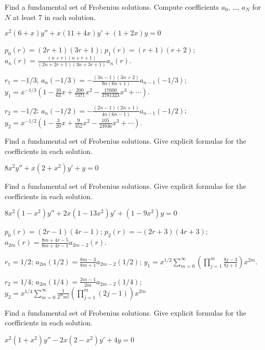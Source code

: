 \documentclass{ximera}
\begin{document}
\begin{problem}\label{exer:7.5.32} 
Find a
fundamental set of Frobenius solutions. Compute
coefficients $a_0$, \dots, $a_N$ for $N$ at least $7$ in each solution.

$x^2(6+x)y''+x(11+4x)y'+(1+2x)y=0$

\begin{solution}
    $p_0(r)=(2r+1)(3r+1)$;
$p_1(r)=(r+1)(r+2)$;
$a_n(r)=\frac{(n+r)(n+r+1)}{(2n+2r+1)(3n+3r+1)} a_n(r)$.

$r_1=-1/3$;
$a_n(-1/3)=-\frac{(3n-1)(3n+2)}{9n(6n+1)}a_{n-1}(-1/3)$;
$y_1=x^{-1/3}\left(1-\frac{10}{63}x+\frac{200}{7371}x^2-
\frac{17600}{3781323}x^3
+\cdots\right)$.

$r_2=-1/2$;
$a_n(-1/2)=-\frac{(2n-1)(2n+1)}{4n(6n-1)} a_{n-1}(-1/2)$;
$y_2=x^{-1/2}\left(1-\frac{3}{20}x+\frac{9}{352}x^2
-\frac{105}{23936}x^3
+\cdots\right)$.
\end{solution}
\end{problem}


\begin{problem}\label{exer:7.5.33} 
Find a
fundamental set of Frobenius solutions. Give explicit formulas for
the coefficients in each solution.

$8x^2y''+x(2+x^2)y'+y=0$
\end{problem}

\begin{problem}\label{exer:7.5.34} 
Find a
fundamental set of Frobenius solutions. Give explicit formulas for
the coefficients in each solution.

$8x^2(1-x^2)y''+2x(1-13x^2)y'+(1-9x^2)y=0$

\begin{solution}
    $p_0(r)=(2r-1)(4r-1)$;
$p_2(r)=-(2r+3)(4r+3)$;
$a_{2m}(r)=\frac{8m+4r-5}{8m+4r-1}a_{2m-2}(r)$.

$r_1=1/2$;
$a_{2m}(1/2)=\frac{8m-3}{8m+1}a_{2m-2}(1/2)$;
$y_1=x^{1/2}\sum_{m=0}^\infty\left(\prod_{j=1}^m\frac{8j-3}{8j+
1}\right)x^{2m}$.

$r_2=1/4$;
$a_{2m}(1/4)=\frac{2m-1}{2m}a_{2m-2}(1/4)$;
$y_2=x^{1/4}\sum_{m=0}^\infty\frac{1}{2^mm!}\left(\prod_{j=1}^m(2j-1)
\right)x^{2m}$
\end{solution}
\end{problem}

\begin{problem}\label{exer:7.5.35} 
Find a
fundamental set of Frobenius solutions. Give explicit formulas for
the coefficients in each solution.

$x^2(1+x^2)y''-2x(2-x^2)y'+4y=0$
\end{problem}
\end{document}
